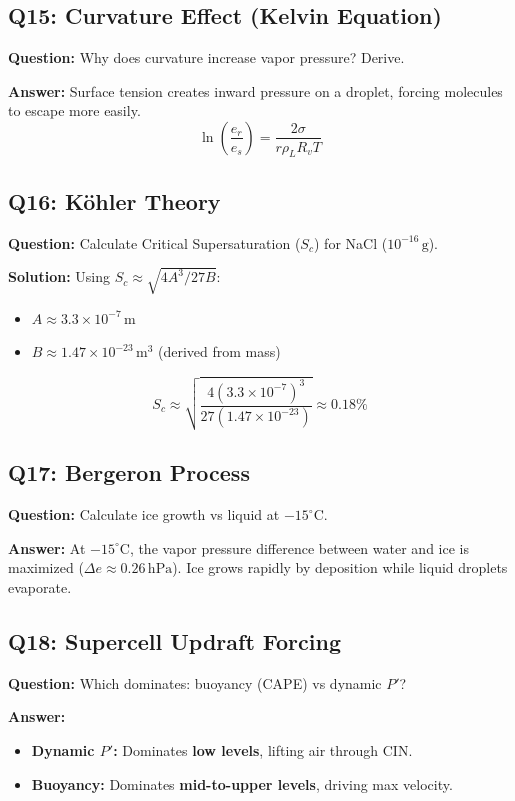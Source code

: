 \documentclass[11pt,a4paper]{article}
\begin{document}
\subsection*{Q15: Curvature Effect (Kelvin Equation)}
\textbf{Question:} Why does curvature increase vapor pressure? Derive.

\textbf{Answer:}
Surface tension creates inward pressure on a droplet, forcing molecules to escape more easily.
\[ \ln\left(\frac{e_r}{e_s}\right) = \frac{2\sigma}{r \rho_L R_v T} \]

\subsection*{Q16: Köhler Theory}
\textbf{Question:} Calculate Critical Supersaturation ($S_c$) for NaCl ($10^{-16}\,\text{g}$).

\textbf{Solution:}
Using $S_c \approx \sqrt{4 A^3 / 27 B}$:
\begin{itemize}
    \item $A \approx 3.3 \times 10^{-7}\,\text{m}$
    \item $B \approx 1.47 \times 10^{-23}\,\text{m}^3$ (derived from mass)
\end{itemize}
\[ S_c \approx \sqrt{\frac{4 (3.3 \times 10^{-7})^3}{27 (1.47 \times 10^{-23})}} \approx \mathbf{0.18\%} \]

\subsection*{Q17: Bergeron Process}
\textbf{Question:} Calculate ice growth vs liquid at $-15^{\circ}\text{C}$.

\textbf{Answer:}
At $-15^\circ\text{C}$, the vapor pressure difference between water and ice is maximized ($\Delta e \approx 0.26\,\text{hPa}$). Ice grows rapidly by deposition while liquid droplets evaporate.

\subsection*{Q18: Supercell Updraft Forcing}
\textbf{Question:} Which dominates: buoyancy (CAPE) vs dynamic $P'$?

\textbf{Answer:}
\begin{itemize}
    \item \textbf{Dynamic $P'$:} Dominates \textbf{low levels}, lifting air through CIN.
    \item \textbf{Buoyancy:} Dominates \textbf{mid-to-upper levels}, driving max velocity.
\end{itemize}
\end{document}
